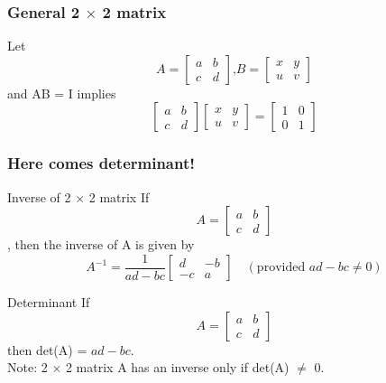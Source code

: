 \documentclass[
	11pt, %
]{beamer}
\begin{document}
\begin{frame}[t]
    \frametitle{General 2 $\times$ 2 matrix}
    Let
    \[
        A = 
        \begin{bmatrix}
            a & b\\
            c & d
        \end{bmatrix}
        \text{,} B = 
        \begin{bmatrix}
            x & y\\
            u & v
        \end{bmatrix}
    \]
    and AB = I implies\\
    \[
        \begin{bmatrix}
            a & b\\
            c & d
        \end{bmatrix}
        \begin{bmatrix}
            x & y\\
            u & v
        \end{bmatrix}
        =
        \begin{bmatrix}
            1 & 0\\
            0 & 1
        \end{bmatrix}
    \]
\end{frame}
\begin{frame}[b]
    \frametitle{Here comes determinant!}
    \begin{block}{Inverse of 2 $\times$ 2 matrix}
        If 
        \[
            A =
            \begin{bmatrix}
                a & b\\
                c & d
            \end{bmatrix}
        \], then the inverse of A is given by\\
        \[
            A^{-1} = \dfrac{1}{ad-bc}
            \begin{bmatrix}
                d & -b\\
                -c & a
            \end{bmatrix}
            \quad (\text{provided } ad-bc \neq 0)
        \]
    \end{block}
\end{frame}

\begin{frame}{Determinant}
    If 
        \[
            A =
            \begin{bmatrix}
                a & b\\
                c & d
            \end{bmatrix}
        \]
        then det(A) = $ad - bc$.\\
        Note: 2 $\times$ 2 matrix A has an inverse only if det(A) $\neq$ 0.
\end{frame}
\end{document}
